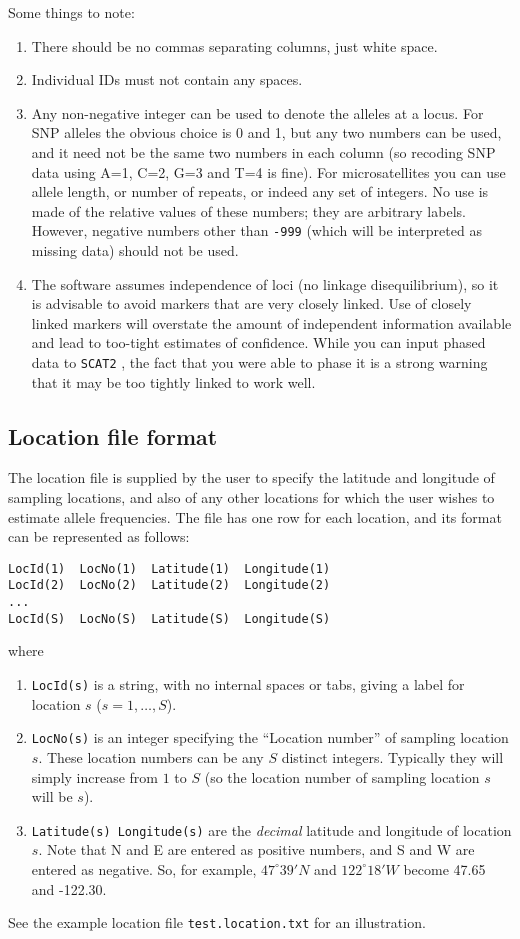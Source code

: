\documentclass[10pt,titlepage,times,letterpaper]{article}
\def\SCAT{{\tt SCAT2} }
\begin{document}
Some things to note:
\begin{enumerate}
\item There should be no commas separating columns, just white space.
\item Individual IDs must not contain any spaces.
\item Any non-negative integer can be used to denote the alleles at a locus.
For SNP alleles the obvious choice is 0 and 1, but any two numbers can be used,
and it need not be the same two numbers in each column (so recoding SNP data 
using A=1, C=2, G=3 and T=4 is fine).  For microsatellites you can use 
allele length, or number of repeats, or indeed any set of integers.  No use 
is made of the relative values of these numbers; they are arbitrary labels.
However, negative numbers other than {\tt -999} (which will be interpreted as
missing data) should not be used.
\item The software assumes independence of loci (no linkage disequilibrium),
so it is advisable to avoid markers that are very closely linked. 
Use of closely linked markers will overstate the amount of independent 
information available and lead to too-tight estimates of confidence.
While you can input phased data to \SCAT, the fact that you were able to phase
it is a strong warning that it may be too tightly linked to work well.
\end{enumerate}

\subsection{Location file format}

The location file is supplied by the user to specify the latitude and
longitude of sampling locations, and also of any other locations
for which the user wishes to estimate allele frequencies.
The file has one row for each location, and its format 
can be represented as follows:
\begin{verbatim}
LocId(1)  LocNo(1)  Latitude(1)  Longitude(1)
LocId(2)  LocNo(2)  Latitude(2)  Longitude(2)
...
LocId(S)  LocNo(S)  Latitude(S)  Longitude(S)
\end{verbatim}
where
\begin{enumerate}
\item{\tt LocId(s)} is a string, with no internal spaces or tabs, giving a label for location $s$
($s = 1,\dots,S$).
\item{\tt LocNo(s)} is an integer specifying the ``Location
number'' of sampling location $s$. These location numbers can be
any $S$ distinct integers. Typically they will simply increase from $1$ to $S$
(so the location number of sampling location $s$ will be $s$). 
\item{{\tt Latitude(s) Longitude(s)}} are the {\it decimal} latitude
and longitude of location $s$. Note that N and E are entered as
positive numbers, and S and W are entered as negative. So, for
example, $47^\circ 39' N$ and $122^\circ 18' W$ become 47.65 and -122.30.
\end{enumerate}
See the example location file {\tt test.location.txt} for an illustration.
\end{document}
